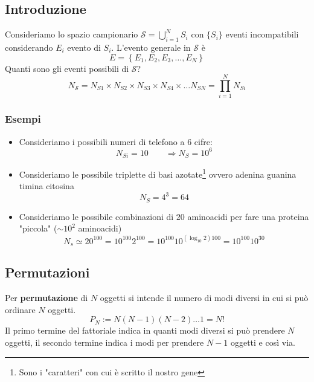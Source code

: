 \documentclass[11pt,a4paper]{book}
\begin{document}
\subsection{Introduzione}
Consideriamo lo spazio campionario $ \mathcal{S} = \bigcup\limits_{i = 1}^NS_i$ con $ \{S_i\} $ eventi incompatibili considerando $ E_i $ evento di $ S_i $. L'evento generale in $ \mathcal{S} $ è 
\begin{equation}
E = \left\lbrace E_1,E_2,E_3, \dots , E_N \right\rbrace 
\end{equation}
Quanti sono gli eventi possibili di $ \mathcal{S} $?
\begin{equation}
N_\mathcal{S} = N_{S1} \times  N_{S2} \times  N_{S3} \times  N_{S4} \times \dots  N_{SN} = \prod \limits_{i = 1}^{N} N_{Si}
\end{equation}
\subsubsection{Esempi}
\begin{itemize}
\item Consideriamo i possibili numeri di telefono a $ 6 $ cifre:
\begin{equation}
N_{Si} = 10 \qquad \Rightarrow N_S = 10^6
\end{equation}
\item Consideriamo le possibile triplette di basi azotate\footnote{Sono i "caratteri" con cui è scritto il nostro gene} ovvero adenina guanina timina citosina
\begin{equation}
N_S = 4^3 = 64
\end{equation}
\item Consideriamo le possibile combinazioni di $ 20 $ aminoacidi per fare una proteina "piccola" ($ \sim 10^2 $ aminoacidi)
\begin{equation}
N_s \simeq 20^{100} = 10^{100} 2^{100} = 10^{100} 10^{(\log_{10}2)100} = 10^{100} 10^{30}
\end{equation}
\end{itemize}
\subsection{Permutazioni} 
Per \textbf{permutazione} di $ N $ oggetti si intende il numero di modi diversi in cui si può ordinare $ N $ oggetti.
\begin{equation}
P_N := N(N-1)(N-2)\dots1 = N!
\end{equation}
Il primo termine del fattoriale indica in quanti modi diversi si può prendere $ N $ oggetti, il secondo termine indica i modi per prendere $ N -1 $ oggetti e così via.
\end{document}
